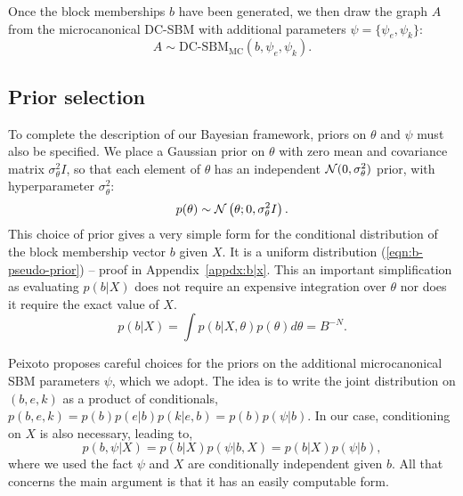 Once the block memberships $b$ have been generated, we then draw the 
graph $A$ from the microcanonical DC-SBM with additional parameters 
$\psi = \{\psi_e, \psi_k\}$:
%
\begin{equation}
	A \sim \textrm{DC-SBM}_{\textrm{MC}} (b, \psi_e, \psi_k).
	\label{eqn:A-generation}
\end{equation}

\subsection{Prior selection}

To complete the description of our Bayesian framework,
priors on $\theta$ and $\psi$ must also be specified. 
We place a Gaussian prior on $\theta$ with zero mean
and covariance matrix $\sigma^2_\theta I$, so that
each element of $\theta$ has an independent ${\cal N}(0,\sigma_\theta^2)$
prior, with hyperparameter $\sigma_\theta^2$:
%
\begin{equation}
	p(\theta) \sim \mathcal{N} \left( \theta ; 0, \sigma_\theta^2 I \right).
	\label{eqn:theta-prior}
\end{equation}
%
This choice of prior gives a very
simple form for the conditional distribution of the block membership vector $b$ given $X$. 
It is a uniform distribution (\ref{eqn:b-pseudo-prior})
 -- proof in Appendix~\ref{appdx:b|x}. This an important simplification as evaluating $p(b | X)$ does not require an expensive  integration over $\theta$ nor does it require the exact value of $X$.
%
\begin{equation}
	p(b | X) = \int p(b | X, \theta) p(\theta) d\theta = B^{-N}.
	\label{eqn:b-pseudo-prior}
\end{equation}
%
 
Peixoto \cite{Peixoto-Bayesian-Microcanonical} proposes careful choices for 
the priors on the additional microcanonical SBM parameters $\psi$, which we adopt. 
The idea is to write the joint distribution on $(b, e, k)$ as a product of 
conditionals, $p(b, e, k) = p(b) p(e | b) p(k | e, b)= p(b) p(\psi | b)$. 
In our case, conditioning on $X$ is also necessary, leading to,
%
\begin{equation}
	p(b, \psi | X) = p(b | X) p(\psi | b, X) = p(b | X) p(\psi | b),
	\label{eqn:joint-pseudo-prior}
\end{equation}
%
where we used the fact $\psi$ and $X$ are conditionally 
independent given $b$.
All that concerns the main argument is that it has
an easily computable form.
